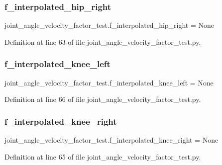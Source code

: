 \subsubsection{\texorpdfstring{f\_interpolated\_hip\_right}{f\_interpolated\_hip\_right}}
{\footnotesize\ttfamily joint\+\_\+angle\+\_\+velocity\+\_\+factor\+\_\+test.\+f\+\_\+interpolated\+\_\+hip\+\_\+right = None}



Definition at line 63 of file joint\+\_\+angle\+\_\+velocity\+\_\+factor\+\_\+test.\+py.

\mbox{\label{namespacejoint__angle__velocity__factor__test_a94c51300f52354694751c2d3a6c58812}} 
\subsubsection{\texorpdfstring{f\_interpolated\_knee\_left}{f\_interpolated\_knee\_left}}
{\footnotesize\ttfamily joint\+\_\+angle\+\_\+velocity\+\_\+factor\+\_\+test.\+f\+\_\+interpolated\+\_\+knee\+\_\+left = None}



Definition at line 66 of file joint\+\_\+angle\+\_\+velocity\+\_\+factor\+\_\+test.\+py.

\mbox{\label{namespacejoint__angle__velocity__factor__test_a70d63fd04e034e1683aef7f89aaef108}} 
\subsubsection{\texorpdfstring{f\_interpolated\_knee\_right}{f\_interpolated\_knee\_right}}
{\footnotesize\ttfamily joint\+\_\+angle\+\_\+velocity\+\_\+factor\+\_\+test.\+f\+\_\+interpolated\+\_\+knee\+\_\+right = None}



Definition at line 65 of file joint\+\_\+angle\+\_\+velocity\+\_\+factor\+\_\+test.\+py.

